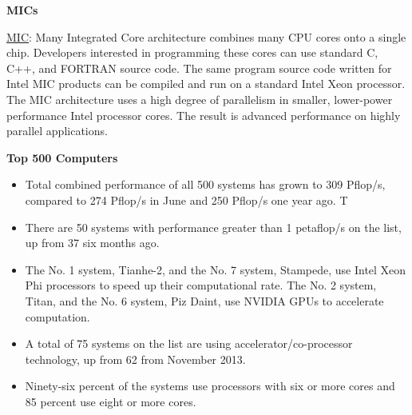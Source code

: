 \documentclass[12pt]{article}
\begin{document}
\vspace*{2em}
\noindent \textbf{MICs}

\underline{MIC}: Many Integrated Core architecture  combines many CPU cores onto a single chip. Developers interested in programming these cores can use standard C, C++, and FORTRAN source code. The same program source code written for Intel MIC products can be compiled and run on a standard Intel Xeon processor. The MIC architecture uses a high degree of parallelism in smaller, lower-power performance Intel processor cores. The result is advanced performance on highly parallel applications.

\vspace*{2em}
\noindent \textbf{Top 500 Computers}
\begin{itemize}
\item Total combined performance of all 500 systems has grown to 309 Pflop/s, compared to 274 Pflop/s in June and 250 Pflop/s one year ago. T%
\item There are 50 systems with performance greater than 1 petaflop/s on the list, up from 37 six months ago.
\item The No. 1 system, Tianhe-2, and the No. 7 system, Stampede, use Intel Xeon Phi processors to speed up their computational rate. The No. 2 system, Titan, and the No. 6 system, Piz Daint, use NVIDIA GPUs to accelerate computation.
\item A total of 75 systems on the list are using accelerator/co-processor technology, up from 62 from November 2013. %
\item Ninety-six percent of the systems use processors with six or more cores and 85 percent use eight or more cores.
\end{itemize}
\end{document}
